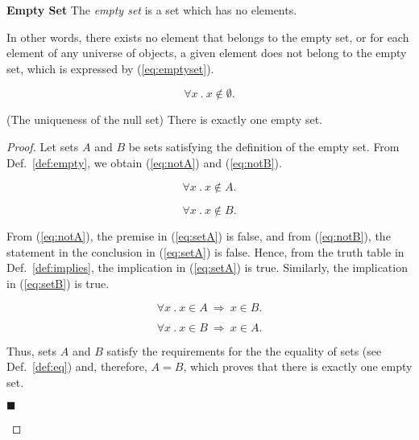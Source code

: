 \documentclass{llncs}
\begin{document}
\vspace{-6mm}

\begin{definition}\label{def:empty} {\bf Empty Set} \rm The {\it empty set} is a set which has no elements.
\end{definition}

\noindent In other words, there exists no element that belongs to the empty set, or for each element of any universe of objects, a given element does not belong to the empty set, which is expressed by (\ref{eq:emptyset}).

\begin{equation}
\label{eq:emptyset}
\forall x~.~x \notin\emptyset .
\end{equation}

\begin{theorem}(The uniqueness of the null set)
There is exactly one empty set.
\end{theorem}

\begin{proof}
\rm Let sets $A$ and $B$ be sets satisfying the definition of the empty set. From Def.~\ref{def:empty}, we obtain (\ref{eq:notA}) and (\ref{eq:notB}).

\vspace{-6mm}

\begin{equation}
\label{eq:notA}
\forall x~.~x \notin A .
\end{equation}

\vspace{-5mm}

\begin{equation}
\label{eq:notB}
\forall x~.~x \notin B.
\end{equation}

\noindent From (\ref{eq:notA}), the premise in (\ref{eq:setA}) is false, and from (\ref{eq:notB}), the statement in the conclusion in (\ref{eq:setA}) is false.  Hence, from the truth table in Def.~\ref{def:implies}, the implication in (\ref{eq:setA}) is true.  Similarly, the implication in (\ref{eq:setB}) is true.

\begin{equation}
\label{eq:setA}
\forall x~.~x \in A\ \Rightarrow\ x\in B .
\end{equation}

\vspace{-5mm}

\begin{equation}
\label{eq:setB}
\forall x~.~x \in B\ \Rightarrow\ x\in A .
\end{equation}

\noindent Thus, sets $A$ and $B$ satisfy the requirements for the the equality of sets (see Def.~\ref{def:eq}) and, therefore, $A = B$, which proves that there is exactly one empty set.
\begin{flushright}
$\blacksquare$
\end{flushright}
\end{proof}
\end{document}
